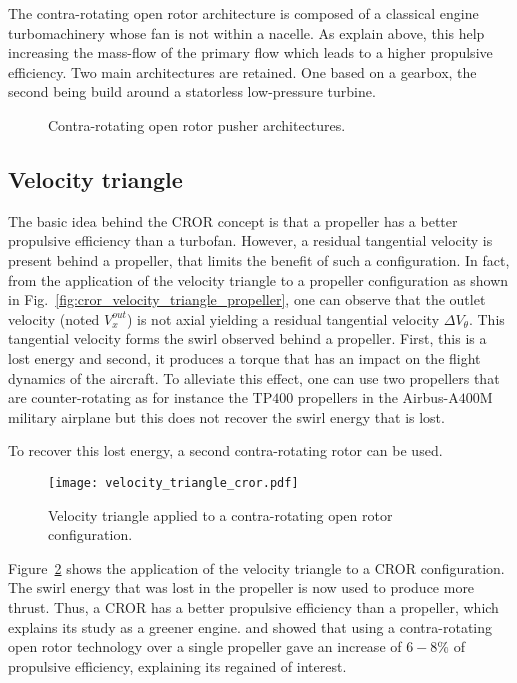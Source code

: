 The contra-rotating open rotor architecture is composed of a classical engine
turbomachinery whose fan is not within a nacelle. As explain
above, this help increasing the mass-flow of the primary flow
which leads to a higher propulsive efficiency.
Two main architectures are retained. One based on a gearbox, the second
being build around a statorless low-pressure turbine.
\begin{figure}[htb]
  \centering
  \caption{Contra-rotating open rotor pusher architectures.}
  \label{fig:cror_architectures}
\end{figure}

\subsection{Velocity triangle}
\label{sub:cror_velocity_triangle}

The basic idea behind the CROR concept is that a propeller has a 
better propulsive efficiency than a turbofan. However,
a residual tangential velocity is present behind a propeller, that limits
the benefit of such a configuration.
In fact, from the application of the velocity triangle to a propeller configuration
as shown in Fig.~\ref{fig:cror_velocity_triangle_propeller}, one can
observe that the outlet velocity (noted $V^{out}_x$) is not axial
yielding a residual tangential velocity $\Delta V_{\theta}$. This tangential velocity forms
the swirl observed behind a propeller. First, this is a lost energy and
second, it produces a torque that has an impact on the flight dynamics
of the aircraft. To alleviate this effect, one can use two propellers
that are counter-rotating as for instance the TP$400$ propellers
in the Airbus-A$400$M military airplane but this does not recover
the swirl energy that is lost.

To recover this lost energy, a second contra-rotating rotor can be used.
\begin{figure}[htbp]
  \centering
  \texttt{[image: velocity\_triangle\_cror.pdf]}
  \caption{Velocity triangle applied to a contra-rotating open rotor configuration.}
  \label{fig:velocity_triangle_cror}
\end{figure}
Figure~\ref{fig:velocity_triangle_cror} shows the application
of the velocity triangle to a CROR configuration. The swirl
energy that was lost in the propeller is now used to 
produce more thrust. Thus, a CROR has a better propulsive
efficiency than a propeller, which explains its study as
a greener engine. \citet{Strack1981} and \citet{Hager1988} showed that
using a contra-rotating open rotor technology over
a single propeller gave an increase of $6-8\%$
of propulsive efficiency, explaining its regained of interest.

